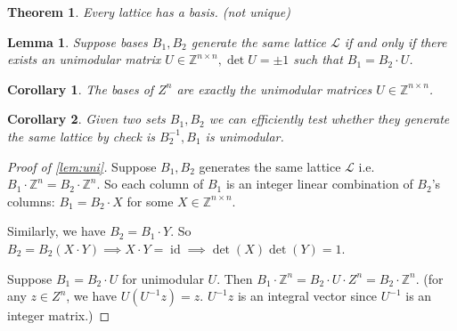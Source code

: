 \documentclass{report}
\newcommand{\Z}{\mathbb{Z}}
\def \id {\operatorname{id}}
\newtheorem{theorem}{Theorem}[section]
\newtheorem{corollary}{Corollary}[section]
\newtheorem{lemma}{Lemma}[section]
\theoremstyle{definition}
\theoremstyle{remark}
\numberwithin{equation}{section}
\begin{document}
\begin{theorem}
    Every lattice has a basis. (not unique)
\end{theorem}
\begin{lemma}\label{lem:uni}
    Suppose bases $B_1, B_2$ generate the same lattice $\mathcal{L}$ if and only if there exists an unimodular matrix $U \in \Z^{n \times n}, \det U = \pm 1$ such that $B_1 = B_2\cdot U$.
\end{lemma}

\begin{corollary}
    The bases of $Z^n$ are exactly the unimodular matrices $U \in \Z^{n \times n}$.
\end{corollary}
\begin{corollary}
    Given two sets $B_1, B_2$ we can efficiently test whether they generate the same lattice by check is $B_2^{-1}, B_1$ is unimodular.
\end{corollary}

\begin{proof}[Proof of \autoref{lem:uni}]
    Suppose $B_1, B_2$ generates the same lattice $\mathcal{L}$ i.e. $B_1\cdot \Z^n = B_2 \cdot \Z^n$. So each column of $B_1$ is an integer linear combination of $B_2$'s columns: $B_1 = B_2\cdot X$ for some $X \in \Z^{n \times n}$.

    Similarly, we have $B_2 = B_1 \cdot Y$. So $B_2 = B_2 (X \cdot Y) \implies X \cdot Y = \id \implies \det(X) \det(Y) = 1$.

    Suppose $B_1 = B_2 \cdot U$ for unimodular $U$. Then $B_1 \cdot \Z^n = B_2 \cdot U \cdot Z^n = B_2 \cdot \Z^n$. (for any $z \in Z^n$, we have $U(U^{-1}z) = z$. $U^{-1}z$ is an integral vector since $U^{-1}$ is an integer matrix.)
\end{proof}
\end{document}
